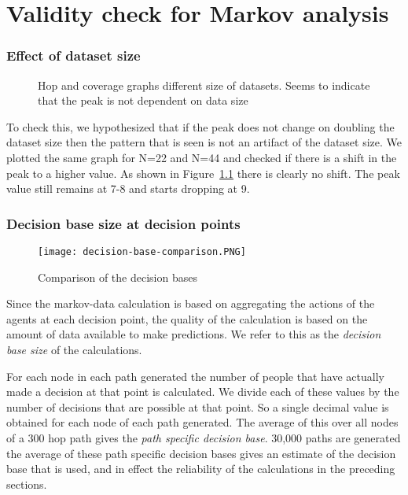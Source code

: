 
\chapter{Validity check for Markov analysis}

\subsection{Effect of dataset size} %
\label{sec:effect_of_dataset_size}
\begin{figure}[!t]
  \centering

  \caption{Hop and coverage graphs different size of datasets. Seems to indicate that the peak is not dependent on data size}
  \label{fig:hop_and_coverage_for_different_n}
\end{figure}




To check this, we hypothesized that if the peak does not change on doubling the dataset size then the pattern that is seen is not an artifact of the dataset size. We plotted the same graph for N=22 and N=44 and checked if there is a shift in the peak to a higher value. As shown in Figure~\ref{fig:hop_and_coverage_for_different_n} there is clearly no shift. The peak value still remains at 7-8 and starts dropping at 9.

\subsection{Decision base size at decision points} %
\label{sec:decision_base_size_at_decision_points}

\begin{figure}[tb]
    \begin{center}
        \texttt{[image: decision-base-comparison.PNG]}
    \end{center}
    \caption{Comparison of the decision bases}
    \label{fig:decision_base_comparison}
\end{figure}

Since the markov-data calculation is based on aggregating the actions of the agents at each decision point, the quality of the calculation is based on the amount of data available to make predictions. We refer to this as the \emph{decision base size} of the calculations.

For each node in each path generated the number of people that have actually made a decision at that point is calculated. We divide each of these values by the number of decisions that are possible at that point. So a single decimal value is obtained for each node of each path generated. The average of this over all nodes of a 300 hop path gives the \emph{path specific decision base}. 30,000 paths are generated the average of these path specific decision bases  gives an estimate of the decision base that is used, and in effect the reliability of the calculations in the preceding sections.


